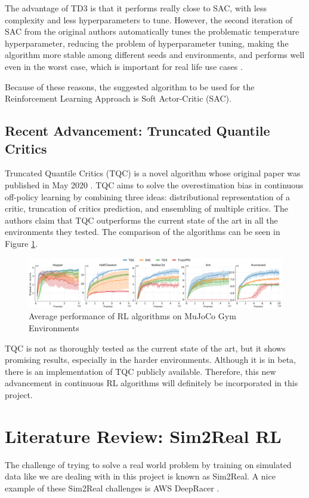 \documentclass[12pt,twoside]{report}
\begin{document}
The advantage of TD3 is that it performs really close to SAC, with less complexity and less hyperparameters to tune. However, the second iteration of SAC from the original authors automatically tunes the problematic temperature hyperparameter, reducing the problem of hyperparameter tuning, making the algorithm more stable among different seeds and environments, and performs well even in the worst case, which is important for real life use cases \cite{sacOG}. 

Because of these reasons, the suggested algorithm to be used for the Reinforcement Learning Approach is Soft Actor-Critic (SAC).

\subsection{Recent Advancement: Truncated Quantile Critics}

Truncated Quantile Critics (TQC) is a novel algorithm whose original paper was published in May 2020 \cite{tqc-paper}. TQC aims to solve the overestimation bias in continuous off-policy learning by combining three ideas: distributional representation of a critic, truncation of critics prediction, and ensembling of multiple critics. The authors claim that TQC outperforms the current state of the art in all the environments they tested. The comparison of the algorithms can be seen in Figure \ref{fig:tqc-comparison}.

\begin{figure}[h]
\centering
\includegraphics[width = \hsize]{figures/tqc comparison.png}
\caption{Average performance of RL algorithms on MuJoCo Gym Environments \cite{tqc-paper}}
\label{fig:tqc-comparison}
\end{figure}

TQC is not as thoroughly tested as the current state of the art, but it shows promising results, especially in the harder environments. Although it is in beta, there is an implementation of TQC publicly available. Therefore, this new advancement in continuous RL algorithms will definitely be incorporated in this project.

\section{Literature Review: Sim2Real RL}
The challenge of trying to solve a real world problem by training on simulated data like we are dealing with in this project is known as Sim2Real. A nice example of these Sim2Real challenges is AWS DeepRacer \cite{aws-deepracer}.
\end{document}
